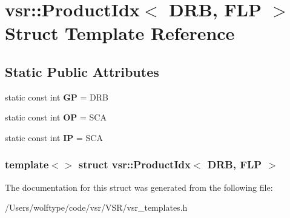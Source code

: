 \hypertarget{structvsr_1_1_product_idx_3_01_d_r_b_00_01_f_l_p_01_4}{\section{vsr\-:\-:Product\-Idx$<$ D\-R\-B, F\-L\-P $>$ Struct Template Reference}
\label{structvsr_1_1_product_idx_3_01_d_r_b_00_01_f_l_p_01_4}
}
\subsection*{Static Public Attributes}
\begin{DoxyCompactItemize}
\item 
\hypertarget{structvsr_1_1_product_idx_3_01_d_r_b_00_01_f_l_p_01_4_a0ca58b6fcf258f4aba4bfddcfe9affc0}{static const int {\bfseries G\-P} = D\-R\-B}\label{structvsr_1_1_product_idx_3_01_d_r_b_00_01_f_l_p_01_4_a0ca58b6fcf258f4aba4bfddcfe9affc0}

\item 
\hypertarget{structvsr_1_1_product_idx_3_01_d_r_b_00_01_f_l_p_01_4_a178144a8daccd516e74b415be60cd848}{static const int {\bfseries O\-P} = S\-C\-A}\label{structvsr_1_1_product_idx_3_01_d_r_b_00_01_f_l_p_01_4_a178144a8daccd516e74b415be60cd848}

\item 
\hypertarget{structvsr_1_1_product_idx_3_01_d_r_b_00_01_f_l_p_01_4_a88d736cb8ba4045fd932a45385e8dd0d}{static const int {\bfseries I\-P} = S\-C\-A}\label{structvsr_1_1_product_idx_3_01_d_r_b_00_01_f_l_p_01_4_a88d736cb8ba4045fd932a45385e8dd0d}

\end{DoxyCompactItemize}
\subsubsection*{template$<$$>$ struct vsr\-::\-Product\-Idx$<$ D\-R\-B, F\-L\-P $>$}



The documentation for this struct was generated from the following file\-:\begin{DoxyCompactItemize}
\item 
/\-Users/wolftype/code/vsr/\-V\-S\-R/vsr\-\_\-templates.\-h\end{DoxyCompactItemize}
